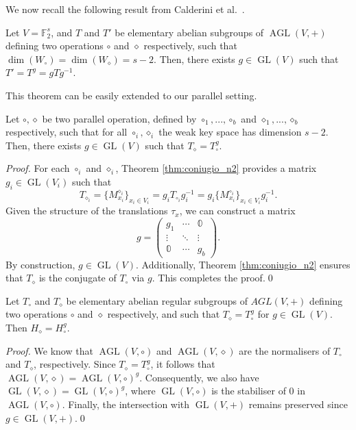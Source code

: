 \documentclass[runningheads,a4paper,english]{llncs}
\newcommand{\F}{\mathbb{F}}
\DeclareMathOperator{\gl}{GL}
\DeclareMathOperator{\GL}{GL}
\DeclareMathOperator{\agl}{AGL}
\begin{document}
We now recall the following result from Calderini et al.~\cite[Theorem 4.10]{calderini2021properties}.
\begin{theorem}
    \label{thm:coniugio_n2}
    Let $V = \F_2^s$, and $T$ and $T'$ be elementary abelian subgroups of $\agl(V, +)$ defining two operations $\circ$ and $\diamond$ respectively, such that $\dim(W_\circ) = \dim(W_\diamond) = s-2$. Then, there exists $g \in \gl(V)$ such that $T' = T^g = gTg^{-1}$.
\end{theorem}
This theorem can be easily extended to our parallel setting.
\begin{theorem}
	\label{thm:coniugio_parallelo}
	Let $\circ, \diamond$ be two parallel operation, defined by $\circ_1,...,\circ_b$ and $\diamond_1,...,\diamond_b$ respectively, such that for all $\circ_i, \diamond_i$ the weak key space has dimension $s-2$. Then, there exists $g \in \GL(V)$ such that $T_\diamond = T_\circ^g$. 
\end{theorem}
\begin{proof}
    For each $\circ_i$ and $\diamond_i$, Theorem \ref{thm:coniugio_n2} provides a matrix $g_i \in \gl(V_i)$ such that 
\[
T_{\diamond_i} = \{ M_{x_i}^{\diamond_i} \}_{x_i \in V_i} = g_i T_{\circ_i} g_i^{-1} = g_i \{ M_{x_i}^{\circ_i} \}_{x_i \in V_i} g_i^{-1}.
\]
Given the structure of the translations $\tau_x$, we can construct a matrix
\[
g = 
\begin{pmatrix}
   g_1 & \cdots & \mathbb{0} \\
   \vdots & \ddots & \vdots \\
   \mathbb{0} & \cdots & g_b
\end{pmatrix}.
\]
By construction, $g \in \gl(V)$. Additionally, Theorem \ref{thm:coniugio_n2} ensures that $T_\diamond$ is the conjugate of $T_\circ$ via $g$. This completes the proof.\qed
\end{proof}
\begin{lemma}
\label{lem:coniugio_ho}
    Let $T_\circ$ and $T_\diamond$ be elementary abelian regular subgroups of $AGL(V, +)$ defining two operations $\circ$ and $\diamond$ respectively, and such that $T_\diamond = T_\circ^g$ for $g \in \GL(V)$. Then $H_\diamond = H_\circ^g$.
\end{lemma}
\begin{proof}
    We know that $\agl(V, \circ)$ and $\agl(V, \diamond)$ are the normalisers of $T_\circ$ and $T_\diamond$, respectively. Since $T_\diamond = T_\circ^g$, it follows that $\agl(V, \diamond) = \agl(V, \circ)^g$. Consequently, we also have $\GL(V, \diamond) = \GL(V, \circ)^g$, where $\GL(V, \circ)$ is the stabiliser of $0$ in $\agl(V, \circ)$. Finally, the intersection with $\GL(V, +)$ remains preserved since $g \in \GL(V, +)$.\qed
\end{proof}
\end{document}
